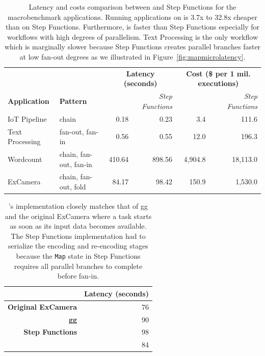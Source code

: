 \begin{table}[t]
\centering
\begin{tabular}{ll|rr|rr}
\hline
                     &                        & \multicolumn{2}{c}{\textbf{Latency (seconds)}}            & \multicolumn{2}{c}{\textbf{Cost (\$ per 1 mil. executions)}}       \\
\textbf{Application} & \textbf{Pattern}       & \textit{\name{}} & \textit{Step Functions}   & \textit{\name{}} & \textit{Step Functions}            \\ \hline
IoT Pipeline         & chain                  & 0.18       & 0.23       & 3.4       & 111.6   \\
Text Processing      & fan-out, fan-in        & 0.56       & 0.55       & 12.0      & 196.3   \\
Wordcount            & chain, fan-out, fan-in & 410.64     & 898.56     & 4,904.8   & 18,113.0 \\
ExCamera             & chain, fan-out, fold   & 84.17      & 98.42      & 150.9     & 1,530.0      \\ \hline
\end{tabular}
\caption{Latency and costs comparison between \name{} and Step Functions for
the macrobenchmark applications. Running applications on \name{} is 3.7x to
32.8x cheaper than on Step Functions. Furthermore, \name{} is faster than Step
Functions especially for workflows with high degrees of parallelism. Text
Processing is the only workflow which \name{} is marginally slower because
Step Functions creates parallel branches faster at low fan-out degrees as we
illustrated in Figure~\ref{fig:mapmicrolatency}.}
\label{table:macro}
\end{table}

\begin{table}[]
\centering
\begin{tabular}{|r|r|}
\hline
                                  & \textbf{Latency (seconds)} \\ \hline
\textbf{Original ExCamera}        & 76                         \\ \hline
\textbf{gg}                       & 90                         \\ \hline
\textbf{Step Functions}           & 98                         \\ \hline
\textbf{\name{}} & 84                         \\ \hline
\end{tabular}
\caption{\name{}'s implementation closely matches that of gg and the original
ExCamera where a task starts as soon as its input data becomes available. The
Step Functions implementation had to serialize the encoding and re-encoding
stages because the \texttt{Map} state in Step Functions requires all parallel
branches to complete before fan-in.}
\label{table:excamera}
\end{table}

